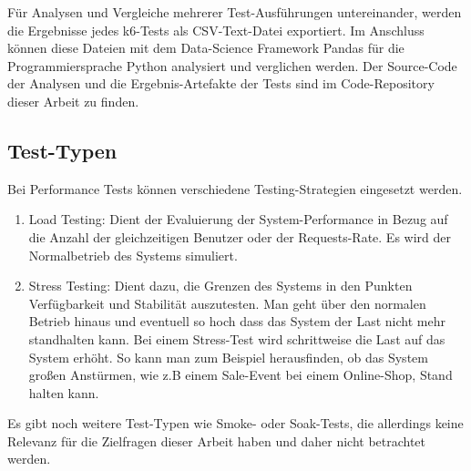 Für Analysen und Vergleiche mehrerer Test-Ausführungen untereinander, werden die Ergebnisse jedes k6-Tests als CSV-Text-Datei exportiert. Im Anschluss können diese Dateien mit dem Data-Science Framework Pandas\cite{noauthor_pandas_nodate} für die Programmiersprache Python analysiert und verglichen werden. Der Source-Code der Analysen und die Ergebnis-Artefakte der Tests sind im Code-Repository dieser Arbeit zu finden.

\subsection{Test-Typen}
Bei Performance Tests können verschiedene Testing-Strategien eingesetzt werden.
\begin{enumerate}
    \item Load Testing: Dient der Evaluierung der System-Performance in Bezug auf die Anzahl der gleichzeitigen Benutzer oder der Requests-Rate. Es wird der Normalbetrieb des Systems simuliert.
    
    \item Stress Testing: Dient dazu, die Grenzen des Systems in den Punkten Verfügbarkeit und  Stabilität auszutesten. Man geht über den normalen Betrieb hinaus und eventuell so hoch dass das System der Last nicht mehr standhalten kann. Bei einem Stress-Test wird schrittweise die Last auf das System erhöht. So kann man zum Beispiel herausfinden, ob das System großen Anstürmen, wie z.B einem Sale-Event bei einem Online-Shop, Stand halten kann.
\end{enumerate}

Es gibt noch weitere Test-Typen wie Smoke- oder Soak-Tests, die allerdings keine Relevanz für die Zielfragen dieser Arbeit haben und daher nicht betrachtet werden.

